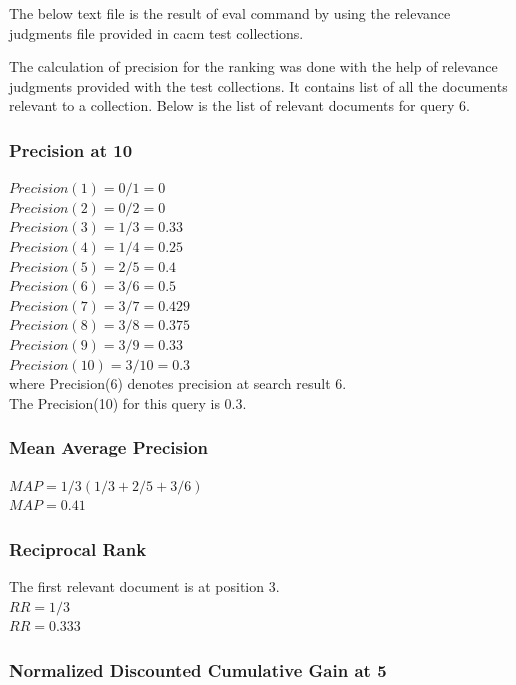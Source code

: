 \documentclass[12pt]{report}
\begin{document}
The below text file is the result of eval command by using the relevance judgments file provided in cacm test collections.


The calculation of precision for the ranking was done with the help of relevance judgments provided with the test collections. It contains list of all the documents relevant to a collection. Below is the list of relevant documents for query 6.



\subsubsection{ Precision at 10}

$Precision(1) = 0/1 = 0$\\
$Precision(2) = 0/2 = 0$\\ 
$Precision(3) = 1/3 = 0.33$\\
$Precision(4) = 1/4 = 0.25$\\
$Precision(5) = 2/5 = 0.4$\\
$Precision(6) = 3/6 = 0.5$\\
$Precision(7) = 3/7 = 0.429$\\
$Precision(8) = 3/8 = 0.375$\\
$Precision(9) = 3/9 = 0.33$\\
$Precision(10) = 3/10 = 0.3$\\
where Precision(6) denotes precision at search result 6.\\
The Precision(10) for this query is 0.3. \\  

\subsubsection{Mean Average Precision}

$MAP = 1/3 (1/3 + 2/5 + 3/6) $\\
$MAP = 0.41$
\subsubsection{Reciprocal Rank}
The first relevant document is at position 3.\\
$RR = 1/3 $\\
$RR = 0.333$\\

\subsubsection{Normalized Discounted Cumulative Gain at 5}
\end{document}
